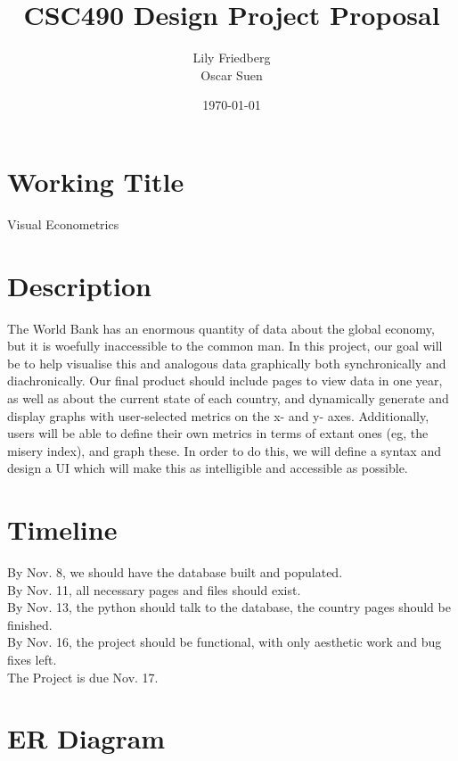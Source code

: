 \documentclass[12pt]{article}
\title{CSC490 Design Project Proposal}
\author{Lily Friedberg \\ Oscar Suen}
\date{\today}
\begin{document}
\maketitle

\section{Working Title}
Visual Econometrics
\section{Description}
The World Bank has an enormous quantity of data about the global economy, but it is woefully inaccessible to the common man. In this project, our goal will be to help visualise this and analogous data graphically both synchronically and diachronically. Our final product should include pages to view data in one year, as well as about the current state of each country, and dynamically generate and display graphs with user-selected metrics on the x- and y- axes. Additionally, users will be able to define their own metrics in terms of extant ones (eg, the misery index), and graph these. In order to do this, we will define a syntax and design a UI which will make this as intelligible and accessible as possible.
\section{Timeline}
By Nov. 8, we should have the database built and populated. \\
By Nov. 11, all necessary pages and files should exist. \\
By Nov. 13, the python should talk to the database, the country pages should be finished. \\
By Nov. 16, the project should be functional, with only aesthetic work and bug fixes left. \\
The Project is due Nov. 17.
\section{ER Diagram}
\end{document}

